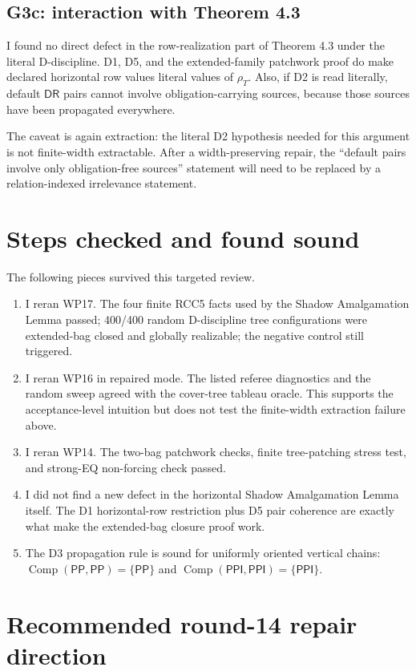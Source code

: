 \documentclass[11pt]{article}
\newcommand{\PP}{\mathsf{PP}}
\newcommand{\PPI}{\mathsf{PPI}}
\newcommand{\DR}{\mathsf{DR}}
\newcommand{\Comp}{\operatorname{Comp}}
\begin{document}
\subsection{G3c: interaction with Theorem 4.3}

I found no direct defect in the row-realization part of Theorem 4.3 under the
literal D-discipline.  D1, D5, and the extended-family patchwork proof do make
declared horizontal row values literal values of $\rho_T$.  Also, if D2 is read
literally, default $\DR$ pairs cannot involve obligation-carrying sources,
because those sources have been propagated everywhere.

The caveat is again extraction: the literal D2 hypothesis needed for this
argument is not finite-width extractable.  After a width-preserving repair, the
``default pairs involve only obligation-free sources'' statement will need to
be replaced by a relation-indexed irrelevance statement.

\section{Steps checked and found sound}

The following pieces survived this targeted review.
\begin{enumerate}[leftmargin=2em]
\item I reran WP17.  The four finite RCC5 facts used by the Shadow
Amalgamation Lemma passed; 400/400 random D-discipline tree configurations
were extended-bag closed and globally realizable; the negative control still
triggered.
\item I reran WP16 in repaired mode.  The listed referee diagnostics and the
random sweep agreed with the cover-tree tableau oracle.  This supports the
acceptance-level intuition but does not test the finite-width extraction
failure above.
\item I reran WP14.  The two-bag patchwork checks, finite tree-patching
stress test, and strong-EQ non-forcing check passed.
\item I did not find a new defect in the horizontal Shadow Amalgamation Lemma
itself.  The D1 horizontal-row restriction plus D5 pair coherence are exactly
what make the extended-bag closure proof work.
\item The D3 propagation rule is sound for uniformly oriented vertical chains:
$\Comp(\PP,\PP)=\{\PP\}$ and $\Comp(\PPI,\PPI)=\{\PPI\}$.
\end{enumerate}

\section{Recommended round-14 repair direction}
\end{document}

